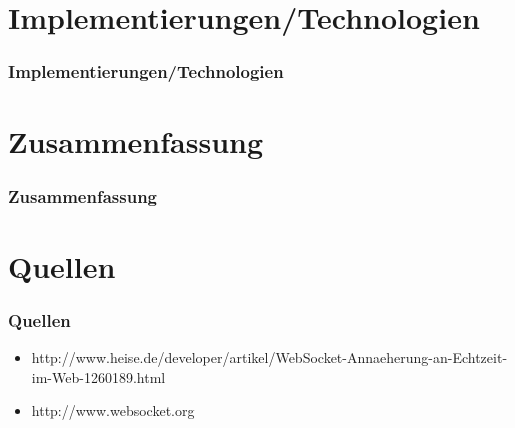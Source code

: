 \documentclass{beamer}
\begin{document}
\section{Implementierungen/Technologien}
\begin{frame}
\frametitle{Implementierungen/Technologien}
\end{frame}

\section{Zusammenfassung}
\begin{frame}
\frametitle{Zusammenfassung}
\end{frame}

\section{Quellen}
\begin{frame}
\frametitle{Quellen}
\begin{itemize}
\item http://www.heise.de/developer/artikel/WebSocket-Annaeherung-an-Echtzeit-im-Web-1260189.html
\item http://www.websocket.org
\end{itemize}
\end{frame}
\end{document}
